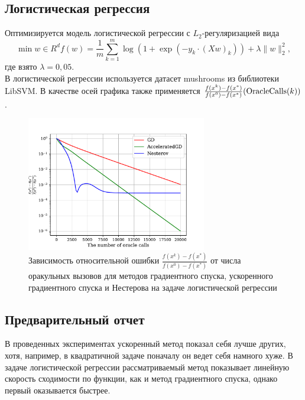 \documentclass{article}
\begin{document}
\subsection{Логистическая регрессия}
Оптимизируется модель логистической регрессии с $L_2$-регуляризацией вида
\begin{equation}
 \min\limits{w \in R^d} f(w) = \frac{1}{m}\sum\limits_{k = 1}^m \log(1 + \exp(-y_k \cdot (Xw)_k)) + \lambda \|w\|_2^2,
\end{equation}
где взято $\lambda = 0,05$.\\
В логистической регрессии используется датасет mushrooms из библиотеки LibSVM. В качестве осей графика также применяется $\frac{f(x^k) - f(x^*)}{f(x^0) - f(x^*)}(\textnormal{OracleCalls}(k))$.
\begin{figure}[!htbp]
\centering
  \includegraphics[width=0.7\textwidth]{../figures/Non_stochastic_Logreg_GD_AGD_Nesterov.pdf}
 \caption{Зависимость относительной ошибки $\frac{f(x^k) - f(x^*)}{f(x^0) - f(x^*)}$ от числа оракульных вызовов для методов градиентного спуска, ускоренного градиентного спуска и Нестерова на задаче логистической регрессии}
  \label{fig:non-stochastic_logreg}
\end{figure}
\subsection{Предварительный отчет}
В проведенных экспериментах ускоренный метод показал себя лучше других, хотя, например, в квадратичной задаче поначалу он ведет себя намного хуже. В задаче логистической регрессии рассматриваемый метод показывает линейную скорость сходимости по функции, как и метод градиентного спуска, однако первый оказывается быстрее.


\end{document}
